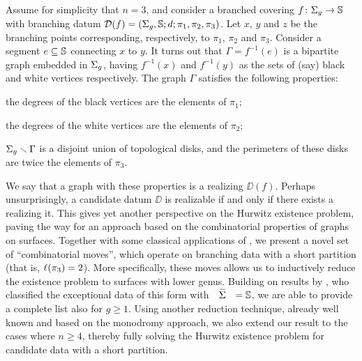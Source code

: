 \section*{\texorpdfstring{\Dessins{}}{Dessins d'enfant}}

Assume for simplicity that $n=3$, and consider a branched covering $\map{f}{\surf{g}}{\sphere{}}$ with branching datum $\mathcal{D}(f)=(\Sigma_{g},\mathbb{S}{};d;\pi_1,\pi_2,\pi_3)$. Let $x$, $y$ and $z$ be the branching points corresponding, respectively, to $\pi_1$, $\pi_2$ and $\pi_3$. Consider a segment $e\subseteq\mathbb{S}{}$ connecting $x$ to $y$. It turns out that $\Gamma=f^{-1}(e)$ is a bipartite graph embedded in $\Sigma_{g}$, having $f^{-1}(x)$ and $f^{-1}(y)$ as the sets of (say) black and white vertices respectively. The graph $\Gamma$ satisfies the following properties:
\begin{enumroman}
\item the degrees of the black vertices are the elements of $\pi_1$;
\item the degrees of the white vertices are the elements of $\pi_2$;
\item $\Sigma_{g}\smallsetminus\Gamma$ is a disjoint union of topological disks, and the perimeters of these disks are twice the elements of $\pi_3$.
\end{enumroman}

We say that a graph with these properties is a \emph{\dessin{}} realizing $\DD(f)$.
Perhaps unsurprisingly, a candidate datum $\DD$ is realizable if and only if there exists a \dessin{} realizing it. This gives yet another perspective on the Hurwitz existence problem, paving the way for an approach based on the combinatorial properties of graphs on surfaces. Together with some classical applications of \dessins{}, we present a novel set of ``combinatorial moves'', which operate on branching data with a short partition (that is, $\ell(\pi_3)=2$). More specifically, these moves allows us to inductively reduce the existence problem to surfaces with lower genus. Building on results by \citeauthor{pakovich}, who classified the exceptional data of this form with $\tSigma=\sphere{}$, we are able to provide a complete list also for $g\ge 1$. Using another reduction technique, already well known and based on the monodromy approach, we also extend our result to the cases where $n\ge 4$, thereby fully solving the Hurwitz existence problem for candidate data with a short partition.



%